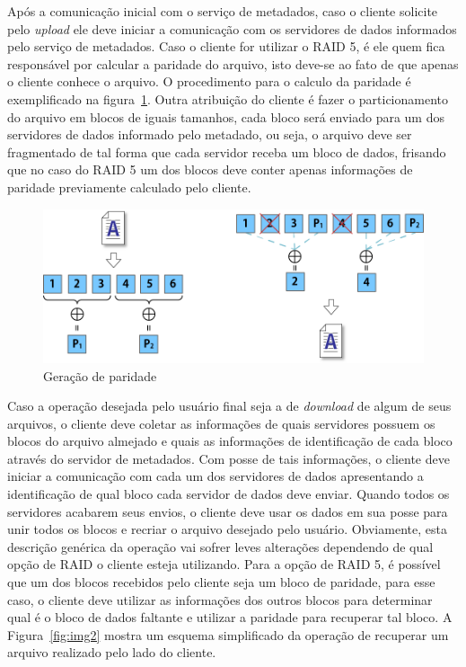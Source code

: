 Após a comunicação inicial com o serviço de metadados, caso o cliente solicite pelo \textit{upload} ele deve iniciar a comunicação com os servidores de dados informados pelo serviço de metadados. Caso o cliente for utilizar o RAID 5, é ele quem fica responsável por calcular a paridade do arquivo, isto deve-se ao fato de que apenas o cliente conhece o arquivo. O procedimento para o calculo da paridade é exemplificado na figura~\ref{fig:img6}. Outra atribuição do cliente é fazer o particionamento do arquivo em blocos de iguais tamanhos, cada bloco será enviado para um dos servidores de dados informado pelo metadado, ou seja, o arquivo deve ser fragmentado de tal forma que cada servidor receba um bloco de dados, frisando que no caso do RAID 5 um dos blocos deve conter apenas informações de paridade previamente calculado pelo cliente. 
\\

\begin{figure}[htb]
	\begin{center}
		
		\includegraphics[clip,width=15.0cm]{images/image6.png}
		\caption{Geração de paridade}
		\label{fig:img6}
	\end{center}
\end{figure}

Caso a operação desejada pelo usuário final seja a de \textit{download} de algum de seus arquivos, o cliente deve coletar as informações de quais servidores possuem os blocos do arquivo almejado e quais as informações de identificação de cada bloco através do servidor de metadados. Com posse de tais informações, o cliente deve iniciar a comunicação com cada um dos servidores de dados apresentando a identificação de qual bloco cada servidor de dados deve enviar. Quando todos os servidores acabarem seus envios, o cliente deve usar os dados em sua posse para unir todos os blocos e recriar o arquivo desejado pelo usuário. Obviamente, esta descrição genérica da operação vai sofrer leves alterações dependendo de qual opção de RAID o cliente esteja utilizando. Para a opção de RAID 5, é possível que um dos blocos recebidos pelo cliente seja um bloco de paridade, para esse caso, o cliente deve utilizar as informações dos outros blocos para determinar qual é o bloco de dados faltante e utilizar a paridade para recuperar tal bloco. A Figura~\ref{fig:img2} mostra um esquema simplificado da operação de recuperar um arquivo realizado pelo lado do cliente.
\\

